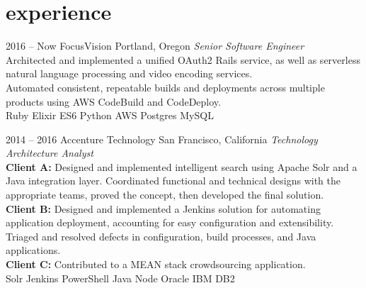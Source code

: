 \documentclass[]{friggeri-cv} %
\begin{document}
\section{experience}

\begin{entrylist}


\entry
{2016 -- Now}
{FocusVision}
{Portland, Oregon}
{\emph{Senior Software Engineer} \\
    Architected and implemented a unified OAuth2 Rails service, as well as serverless natural language processing and video encoding services.
    \vspace{1mm}\\
    Automated consistent, repeatable builds and deployments across multiple products using AWS CodeBuild and CodeDeploy.
    \\
Ruby \mydot Elixir \mydot ES6 \mydot Python \mydot AWS \mydot Postgres \mydot MySQL}

\entry
{2014 -- 2016}
{Accenture Technology}
{San Francisco, California}
{\emph{Technology Architecture Analyst} \\
    \textbf{Client A:} Designed and implemented intelligent search using Apache Solr and a Java integration layer. Coordinated functional and technical designs with the appropriate teams, proved the concept, then developed the final solution.
    \\
    \textbf{Client B:} Designed and implemented a Jenkins solution for automating application deployment, accounting for easy configuration and extensibility. Triaged and resolved defects in configuration, build processes, and Java applications.
    \\
    \textbf{Client C:} Contributed to a MEAN stack crowdsourcing application. \\
Solr \mydot Jenkins \mydot PowerShell \mydot Java \mydot Node \mydot Oracle \mydot IBM DB2}


\end{entrylist}
\end{document}
